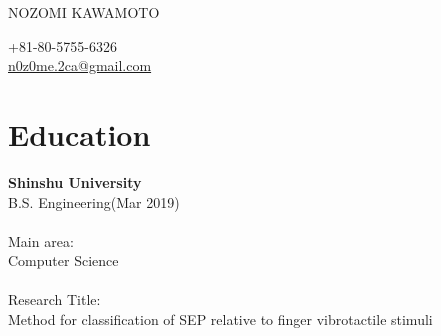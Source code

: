\documentclass[11pt]{article} %
\begin{document}

\parbox[top][0.12\textheight][c]{\linewidth}{ %
	\vspace{-0.04\textheight} %
	{\color{name}\Huge NOZOMI KAWAMOTO}\\\medskip %
}

\begin{paracol}{2} %


{\faPhone} \hspace{1mm} +81-80-5755-6326 \\ %
{\small\faEnvelope} \hspace{1mm} \href{mailto:n0z0me.2ca@gmail.com}{\small n0z0me.2ca@gmail.com} \\ %

\vspace{1cm}


\section{\Large Education}
\textbf{\color{subtitle}\large Shinshu University}\\
B.S. Engineering(Mar 2019)\\
\\
Main area:\\
Computer Science\\
\\
Research Title:\\
Method for classification of SEP relative to finger vibrotactile stimuli\\

\vspace{1cm}


\end{paracol}
\end{document}
